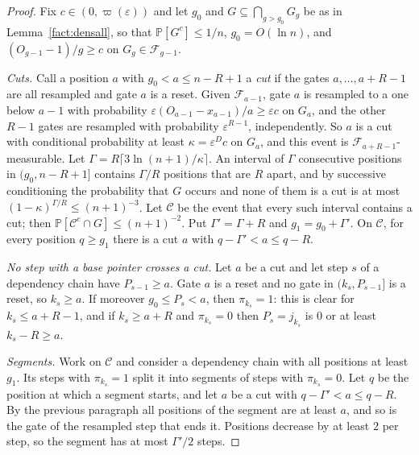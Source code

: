 \documentclass[11pt]{amsart}
\theoremstyle{definition}
\theoremstyle{remark}
\newcommand{\eps}{\varepsilon}
\newcommand{\PP}{\mathbb{P}}
\newcommand{\cF}{\mathcal{F}}
\begin{document}
\begin{proof}
Fix $c\in(0,\varpi(\eps))$ and let $g_0$ and $G\subseteq\bigcap_{g>g_0}G_g$ be as in
Lemma~\ref{fact:densall}, so that $\PP[G^c]\le1/n$, $g_0=O(\ln n)$, and $(O_{g-1}-1)/g\ge c$ on
$G_g\in\cF_{g-1}$.

\emph{Cuts.} Call a position $a$ with $g_0<a\le n-R+1$ a \emph{cut} if the gates
$a,\dots,a+R-1$ are all resampled and gate $a$ is a reset. Given $\cF_{a-1}$, gate $a$ is resampled
to a one below $a-1$ with probability $\eps(O_{a-1}-x_{a-1})/a\ge\eps c$ on $G_a$, and the other
$R-1$ gates are resampled with probability $\eps^{R-1}$, independently. So $a$ is a cut with
conditional probability at least $\kappa=\eps^Dc$ on $G_a$, and this event is
$\cF_{a+R-1}$-measurable. Let $\Gamma=R\lceil3\ln(n+1)/\kappa\rceil$. An interval of $\Gamma$
consecutive positions in $(g_0,n-R+1]$ contains $\Gamma/R$ positions that are $R$ apart, and by
successive conditioning the probability that $G$ occurs and none of them is a cut is at most
$(1-\kappa)^{\Gamma/R}\le(n+1)^{-3}$. Let $\mathcal C$ be the event that every such interval
contains a cut; then $\PP[\mathcal C^c\cap G]\le(n+1)^{-2}$. Put $\Gamma'=\Gamma+R$ and
$g_1=g_0+\Gamma'$. On $\mathcal C$, for every position $q\ge g_1$ there is a cut $a$ with
$q-\Gamma'<a\le q-R$.

\emph{No step with a base pointer crosses a cut.} Let $a$ be a cut and let step $s$ of a dependency
chain have $P_{s-1}\ge a$. Gate $a$ is a reset and no gate in $(k_s,P_{s-1}]$ is a reset, so
$k_s\ge a$. If moreover $g_0\le P_s<a$, then $\pi_{k_s}=1$: this is clear for $k_s\le a+R-1$, and
if $k_s\ge a+R$ and $\pi_{k_s}=0$ then $P_s=j_{k_s}$ is $0$ or at least $k_s-R\ge a$.

\emph{Segments.} Work on $\mathcal C$ and consider a dependency chain with all positions at least
$g_1$. Its steps with $\pi_{k_s}=1$ split it into segments of steps with $\pi_{k_s}=0$. Let $q$ be
the position at which a segment starts, and let $a$ be a cut with $q-\Gamma'<a\le q-R$. By the
previous paragraph all positions of the segment are at least $a$, and so is the gate of the
resampled step that ends it. Positions decrease by at least $2$ per step, so the segment has at
most $\Gamma'/2$ steps.


\end{proof}
\end{document}
